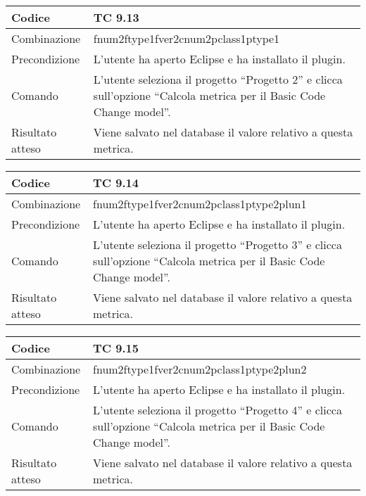 \begin{table}[ht]
\begin{tabular}{|p{3cm}|p{9cm}|}
\hline
\cellcolor{lightgray}Codice				& TC 9.13								\\
\hline
\cellcolor{lightgray}Combinazione		& fnum2ftype1fver2cnum2pclass1ptype1									\\
\hline
\cellcolor{lightgray}Precondizione		& L'utente ha aperto Eclipse e ha installato il plugin.		\\
\hline
\cellcolor{lightgray}Comando			& L'utente seleziona il progetto ``Progetto 2''  e clicca sull'opzione ``Calcola metrica per il Basic Code Change model''.	\\
\hline
\cellcolor{lightgray}Risultato atteso	& Viene salvato nel database il valore relativo a questa metrica.\\
\hline
\end{tabular}
\end{table}


\begin{table}[ht]
\begin{tabular}{|p{3cm}|p{9cm}|}
\hline
\cellcolor{lightgray}Codice				& TC 9.14								\\
\hline
\cellcolor{lightgray}Combinazione		& fnum2ftype1fver2cnum2pclass1ptype2plun1									\\
\hline
\cellcolor{lightgray}Precondizione		& L'utente ha aperto Eclipse e ha installato il plugin.		\\
\hline
\cellcolor{lightgray}Comando			& L'utente seleziona il progetto ``Progetto 3''  e clicca sull'opzione ``Calcola metrica per il Basic Code Change model''.	\\
\hline
\cellcolor{lightgray}Risultato atteso	& Viene salvato nel database il valore relativo a questa metrica.\\
\hline
\end{tabular}
\end{table}


\begin{table}[ht]
\begin{tabular}{|p{3cm}|p{9cm}|}
\hline
\cellcolor{lightgray}Codice				& TC 9.15								\\
\hline
\cellcolor{lightgray}Combinazione		& fnum2ftype1fver2cnum2pclass1ptype2plun2									\\
\hline
\cellcolor{lightgray}Precondizione		& L'utente ha aperto Eclipse e ha installato il plugin.		\\
\hline
\cellcolor{lightgray}Comando			& L'utente seleziona il progetto ``Progetto 4''  e clicca sull'opzione ``Calcola metrica per il Basic Code Change model''.	\\
\hline
\cellcolor{lightgray}Risultato atteso	& Viene salvato nel database il valore relativo a questa metrica.\\
\hline
\end{tabular}
\end{table}


